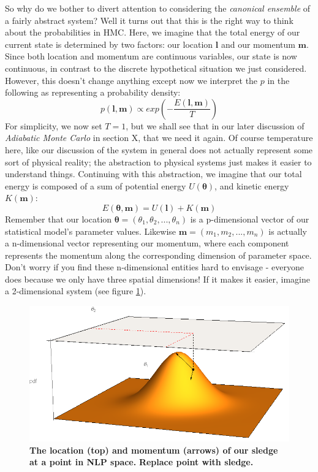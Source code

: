 \documentclass[11pt,fullpage]{book}
\begin{document}
So why do we bother to divert attention to considering the \textit{canonical ensemble} of a fairly abstract system? Well it turns out that this is the right way to think about the probabilities in HMC. Here, we imagine that the total energy of our current state is determined by two factors: our location $\boldsymbol{l}$ and our momentum $\boldsymbol{m}$. Since both location and momentum are continuous variables, our state is now continuous, in contrast to the discrete hypothetical situation we just considered. However, this doesn't change anything except now we interpret the $p$ in the following as representing a probability density:
%
\begin{equation}\label{eq:HMC_HMCCanonical}
p(\boldsymbol{l},\boldsymbol{m}) \propto exp(-\frac{E(\boldsymbol{l},\boldsymbol{m})}{T})
\end{equation}
%
For simplicity, we now set $T=1$, but we shall see that in our later discussion of \textit{Adiabatic Monte Carlo} in section X, that we need it again. Of course temperature here, like our discussion of the system in general does not actually represent some sort of physical reality; the abstraction to physical systems just makes it easier to understand things. Continuing with this abstraction, we imagine that our total energy is composed of a sum of potential energy $U(\boldsymbol{\theta})$, and kinetic energy $K(\boldsymbol{m})$:
%
\begin{equation}
E(\boldsymbol{\theta},\boldsymbol{m}) = U(\boldsymbol{l}) + K(\boldsymbol{m})
\end{equation}
%
Remember that our location $\boldsymbol{\theta} = (\theta_1,\theta_2,...,\theta_n)$ is a p-dimensional vector of our statistical model's parameter values. Likewise $\boldsymbol{m} = (m_1,m_2,...,m_n)$ is actually a n-dimensional vector representing our momentum, where each component represents the momentum along the corresponding dimension of parameter space. Don't worry if you find these n-dimensional entities hard to envisage - everyone does because we only have three spatial dimensions! If it makes it easier, imagine a 2-dimensional system (see figure \ref{fig:HMC_idealised2DSystem}).

\begin{figure}
\centerline{\includegraphics[width=1\textwidth]{HMC_idealised2DSystem.png}}
\caption{\textbf{The location (top) and momentum (arrows) of our sledge at a point in NLP space.} \textbf{Replace point with sledge.}}\label{fig:HMC_idealised2DSystem}
\end{figure}
\end{document}
